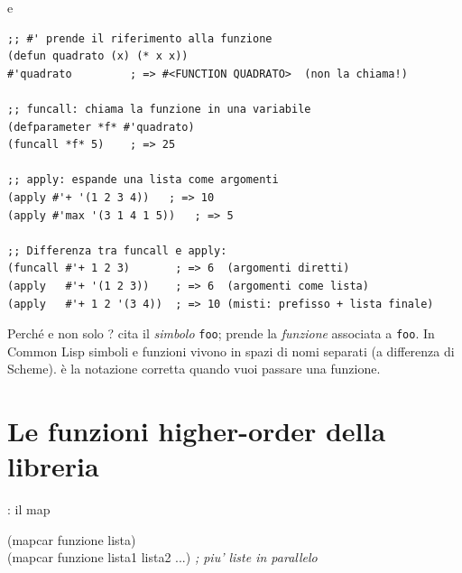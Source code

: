 
\begin{concetto}{ e }
\end{concetto}

\begin{esempio}
\begin{lstlisting}
;; #' prende il riferimento alla funzione
(defun quadrato (x) (* x x))
#'quadrato         ; => #<FUNCTION QUADRATO>  (non la chiama!)

;; funcall: chiama la funzione in una variabile
(defparameter *f* #'quadrato)
(funcall *f* 5)    ; => 25

;; apply: espande una lista come argomenti
(apply #'+ '(1 2 3 4))   ; => 10
(apply #'max '(3 1 4 1 5))   ; => 5

;; Differenza tra funcall e apply:
(funcall #'+ 1 2 3)       ; => 6  (argomenti diretti)
(apply   #'+ '(1 2 3))    ; => 6  (argomenti come lista)
(apply   #'+ 1 2 '(3 4))  ; => 10 (misti: prefisso + lista finale)
\end{lstlisting}
\end{esempio}

\begin{nota}
Perché  e non solo ?
 cita il \emph{simbolo} \texttt{foo};
 prende la \emph{funzione} associata a \texttt{foo}.
In Common Lisp simboli e funzioni vivono in spazi di nomi separati
(a differenza di Scheme).  è la notazione corretta quando
vuoi passare una funzione.
\end{nota}

\section{Le funzioni higher-order della libreria}

\begin{concetto}{: il map}

\begin{sintassi}
(mapcar funzione lista)\\
(mapcar funzione lista1 lista2 ...)  \textit{; piu' liste in parallelo}
\end{sintassi}
\end{concetto}

